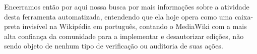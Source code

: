 Encerramos então por aqui nossa busca por mais informações sobre a atividade desta ferramenta automatizada, entendendo que ela hoje opera como uma caixa-preta invisível na Wikipédia em português, contando o MediaWiki com a mais alta confiança da comunidade para a implementar e desautorizar edições, não sendo objeto de nenhum tipo de verificação ou auditoria de suas ações.